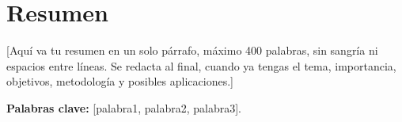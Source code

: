 \section*{Resumen}
[Aquí va tu resumen en un solo párrafo, máximo 400 palabras, sin sangría ni espacios entre líneas. Se redacta al final, cuando ya tengas el tema, importancia, objetivos, metodología y posibles aplicaciones.]

\textbf{Palabras clave:} [palabra1, palabra2, palabra3].
